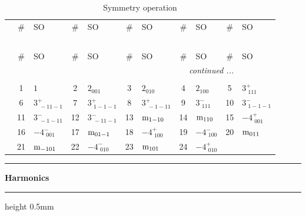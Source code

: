 \documentclass[fleqn,10pt,landscape]{jsarticle}
\begin{document}
\renewcommand{\arraystretch}{1.6}
\begin{longtable}[l]{c|cl|cl|cl|cl|cl}
\captionsetup{justification=raggedright, singlelinecheck=off}
\caption{Symmetry operation}
 \\
 \hline \hline
 & \# & SO & \# & SO & \# & SO & \# & SO & \# & SO \\ \hline \endfirsthead

\multicolumn{10}{l}{\tablename\ \thetable{}} \\
 \hline \hline
 & \# & SO & \# & SO & \# & SO & \# & SO & \# & SO \\ \hline \endhead

 \hline \hline
\multicolumn{10}{r}{\footnotesize\it continued ...} \\ \endfoot

 \hline \hline
\multicolumn{10}{r}{} \\ \endlastfoot

 & 1 & $1$ & 2 & $2{}_{001}$ & 3 & $2{}_{010}$ & 4 & $2{}_{100}$ & 5 & $3^{+}_{\,\,111}$ \\
& 6 & $3^{+}_{\,\,-11-1}$ & 7 & $3^{+}_{\,\,1-1-1}$ & 8 & $3^{+}_{\,\,-1-11}$ & 9 & $3^{-}_{\,\,111}$ & 10 & $3^{-}_{\,\,1-1-1}$ \\
& 11 & $3^{-}_{\,\,-1-11}$ & 12 & $3^{-}_{\,\,-11-1}$ & 13 & ${\rm m}_{1-10}$ & 14 & ${\rm m}_{110}$ & 15 & $-4^{+}_{\,\,001}$ \\
& 16 & $-4^{-}_{\,\,001}$ & 17 & ${\rm m}_{01-1}$ & 18 & $-4^{+}_{\,\,100}$ & 19 & $-4^{-}_{\,\,100}$ & 20 & ${\rm m}_{011}$ \\
& 21 & ${\rm m}_{-101}$ & 22 & $-4^{-}_{\,\,010}$ & 23 & ${\rm m}_{101}$ & 24 & $-4^{+}_{\,\,010}$ &  &  \\
\end{longtable}
\vspace{5mm}
\noindent \rule[0.5mm]{5mm}{0.5mm}\hspace{3mm}\textbf{Harmonics}\hspace{3mm}\leaders\hrule height 0.5mm\hfill\kern0pt
\vspace{3mm}
\end{document}
